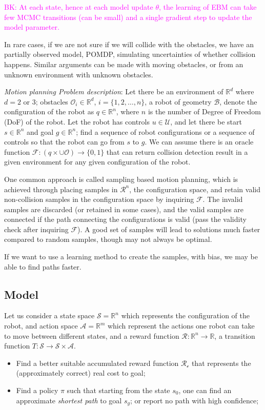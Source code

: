 \documentclass{article}
\begin{document}
\textcolor{magenta}{BK: At each state, hence at each model update $\theta$, the learning of EBM can take few MCMC transitions (can be small) and a single gradient step to update the model parameter.}

In rare cases, if we are not sure if we will collide with the obstacles, we have an partially observed model, POMDP, simulating uncertainties of whether collision happens. Similar arguments can be made with moving obstacles, or from an unknown environment with unknown obstacles. 


\noindent\textit{Motion planning Problem description}: Let there be an environment of $\mathbb{R}^d$ where $d = 2$ or $3$; obstacles $\mathcal{O}_i\in\mathbb{R}^d$, $i = \{1, 2, \ldots, n\}$, a robot of geometry $\mathcal{B}$, denote the configuration of the robot as $q\in\mathbb{R}^n$, where $n$ is the number of Degree of Freedom (DoF) of the robot. Let the robot has controls $u\in\mathcal{U}$, and let there be start $s\in\mathbb{R}^n$ and goal $g\in\mathbb{R}^n$; find a sequence of robot configurations or a sequence of controls so that the robot can go from $s$ to $g$. We can assume there is an oracle function $\mathcal{F}:(q\times \cup\mathcal{O})\rightarrow \{0, 1\}$ that can return collision detection result in a given environment for any given configuration of the robot. 

One common approach is called sampling based motion planning, which is achieved through placing samples in $\mathcal{R}^n$, the configuration space, and retain valid non-collision samples in the configuration space by inquiring $\mathcal{F}$. The invalid samples are discarded (or retained in some cases), and the valid samples are connected if the path connecting the configurations is valid (pass the validity check after inquiring $\mathcal{F}$). A good set of samples will lead to solutions much faster compared to random samples, though may not always be optimal. 

If we want to use a learning method to create the samples, with bias, we may be able to find paths faster. 

\subsection{Model}

Let us consider a state space $\mathcal{S} = \mathbb{R}^n$ which represents the configuration of the robot, and action space $\mathcal{A} = \mathbb{R}^m$ which represent the actions one robot can take to move between different states, and a reward function $\mathcal{R}:\mathbb{R}^n\rightarrow \mathbb{R}$, a transition function $T:\mathcal{S}\rightarrow\mathcal{S}\times \mathcal{A}$. 
\begin{itemize}
    \item Find a better suitable accumulated reward function $\mathcal{R_c}$ that represents the (approximately correct) real cost to goal; 
    \item Find a policy $\pi$ such that starting from the state $s_0$, one can find an approximate {\em shortest path} to goal $s_g$; or report no path with high confidence; 
\end{itemize}
\end{document}
